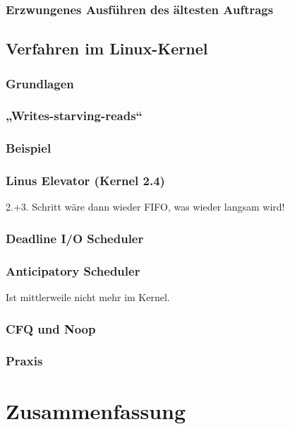 \subsubsection*{Erzwungenes Ausführen des ältesten Auftrags}

\subsection{Verfahren im Linux-Kernel}

\subsubsection{Grundlagen}

\subsubsection{„Writes-starving-reads“}
\subsubsection*{Beispiel}

\subsubsection{Linus Elevator (Kernel 2.4)}
2.+3. Schritt wäre dann wieder FIFO, was wieder langsam wird!

\subsubsection{Deadline I/O Scheduler}

\subsubsection{Anticipatory Scheduler}
Ist mittlerweile nicht mehr im Kernel.

\subsubsection{CFQ und Noop}

\subsubsection{Praxis}

\section{Zusammenfassung}



